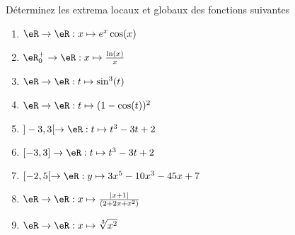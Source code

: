 
\begin{exercice}\label{exoOptimSS0001}

Déterminez les extrema locaux et globaux des fonctions suivantes


\begin{multicols}{2}

\begin{enumerate}
\item $ \eR \rightarrow \eR : x \mapsto e^x \cos(x)$
\item $ \eR_0^+ \rightarrow \eR : x \mapsto \frac{\ln(x)}{x} $
\item $ \eR \rightarrow \eR : t \mapsto \sin^3(t) $
\item $ \eR \rightarrow  \eR : t \mapsto (1 -\cos(t))^2 $
\item $ ]-3,3[ \rightarrow \eR : t \mapsto t^3-3t+2 $
\item $ [-3,3] \rightarrow \eR : t \mapsto t^3-3t+2 $
\item $ [-2,5[ \rightarrow \eR : y \mapsto 3x^5 - 10x^3 - 45 x + 7 $
\item $ \eR \rightarrow \eR : x \mapsto \frac{|x+1|}{(2 + 2x +x^2)} $
\item $ \eR \rightarrow \eR : x \mapsto \sqrt[3]{x^2} $
\end{enumerate}
\end{multicols}


\end{exercice}
